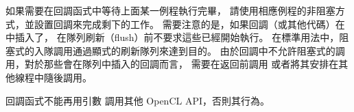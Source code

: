 如果需要在回調函式中等待上面某一例程執行完畢，
請使用相應例程的非阻塞方式，並設置回調來完成剩下的工作。
需要注意的是，如果回調（或其他代碼）在中插入了，
在隊列刷新（flush）前不要求這些已經開始執行。
在標準用法中，阻塞式的入隊調用通過顯式的刷新隊列來達到目的。
由於回調中不允許阻塞式的調用，對於那些會在隊列中插入的回調而言，
需要在返回前調用  或者將其安排在其他線程中隨後調用。

回調函式不能再用引數  調用其他 OpenCL API，否則其行為。
\stopnotepar
